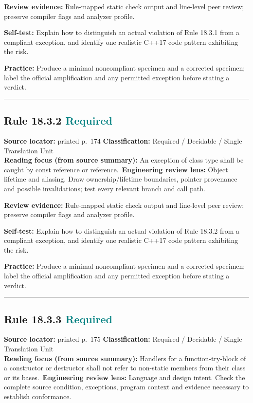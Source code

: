 \documentclass[10pt,letterpaper]{article}
\begin{document}
\textbf{Review evidence:} Rule-mapped static check output and line-level peer review; preserve compiler flags and analyzer profile.

\textbf{Self-test:} Explain how to distinguish an actual violation of Rule 18.3.1 from a compliant exception, and identify one realistic C++17 code pattern exhibiting the risk.\par
\textbf{Practice:} Produce a minimal noncompliant specimen and a corrected specimen; label the official amplification and any permitted exception before stating a verdict.
\smallskip\hrule\smallskip
\subsection*{Rule 18.3.2 \enspace \texorpdfstring{\small\textcolor{teal}{Required}}{Required}}
\noindent\textbf{Source locator:} printed p.~174 \quad\textbf{Classification:} Required / Decidable / Single Translation Unit\\
\textbf{Reading focus (from source summary):} An exception of class type shall be caught by const reference or reference.\
\textbf{Engineering review lens:} Object lifetime and aliasing. Draw ownership/lifetime boundaries, pointer provenance and possible invalidations; test every relevant branch and call path.

\textbf{Review evidence:} Rule-mapped static check output and line-level peer review; preserve compiler flags and analyzer profile.

\textbf{Self-test:} Explain how to distinguish an actual violation of Rule 18.3.2 from a compliant exception, and identify one realistic C++17 code pattern exhibiting the risk.\par
\textbf{Practice:} Produce a minimal noncompliant specimen and a corrected specimen; label the official amplification and any permitted exception before stating a verdict.
\smallskip\hrule\smallskip
\subsection*{Rule 18.3.3 \enspace \texorpdfstring{\small\textcolor{teal}{Required}}{Required}}
\noindent\textbf{Source locator:} printed p.~175 \quad\textbf{Classification:} Required / Decidable / Single Translation Unit\\
\textbf{Reading focus (from source summary):} Handlers for a function-try-block of a constructor or destructor shall not refer to non-static members from their class or its bases.\
\textbf{Engineering review lens:} Language and design intent. Check the complete source condition, exceptions, program context and evidence necessary to establish conformance.
\end{document}
